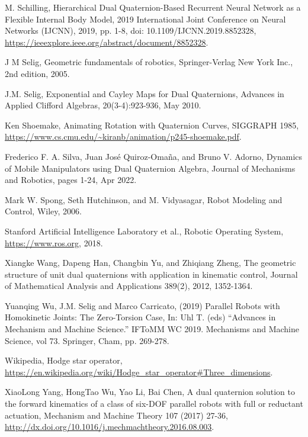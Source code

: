 \documentclass[reqno,12pt]{amsart}
\begin{document}
\begin{thebibliography}{99}
 M. Schilling, Hierarchical Dual Quaternion-Based Recurrent Neural Network as a Flexible Internal Body Model, 2019 International Joint Conference on Neural Networks (IJCNN), 2019, pp. 1-8, doi: 10.1109/IJCNN.2019.8852328, \url{https://ieeexplore.ieee.org/abstract/document/8852328}.

 J M Selig, Geometric fundamentals of robotics, Springer-Verlag New York Inc., 2nd edition, 2005.

 J.M. Selig, Exponential and Cayley Maps for Dual Quaternions, Advances in Applied Clifford Algebras, 20(3-4):923-936, May 2010.

 Ken Shoemake, Animating Rotation with Quaternion Curves, SIGGRAPH 1985, \url{https://www.cs.cmu.edu/~kiranb/animation/p245-shoemake.pdf}.

 Frederico F. A. Silva, Juan Jos\'e Quiroz-Oma\~na, and Bruno V. Adorno, Dynamics of Mobile Manipulators using Dual Quaternion Algebra, Journal of Mechanisms and Robotics, pages 1-24, Apr 2022.

 Mark W. Spong, Seth Hutchinson, and M. Vidyasagar, Robot Modeling and Control, Wiley, 2006.

 Stanford Artificial Intelligence Laboratory et al., Robotic Operating System, \url{https://www.ros.org}, 2018.

 Xiangke Wang, Dapeng Han, Changbin Yu, and Zhiqiang Zheng, The geometric structure of unit dual quaternions with application in kinematic control, Journal of Mathematical Analysis and Applications 389(2), 2012, 1352-1364.

 Yuanqing Wu, J.M. Selig and Marco Carricato,  (2019) Parallel
Robots with Homokinetic Joints: The Zero-Torsion Case, In: Uhl T. (eds) ``Advances in Mechanism and Machine Science.'' IFToMM WC 2019. Mechanisms and Machine Science, vol 73. Springer, Cham, pp. 269-278.

 Wikipedia, Hodge star operator, \url{https://en.wikipedia.org/wiki/Hodge_star_operator#Three_dimensions}.

 XiaoLong Yang, HongTao Wu, Yao Li, Bai Chen, A dual quaternion solution to the forward kinematics of a class of six-DOF parallel robots with full or reductant actuation, Mechanism and Machine Theory 107 (2017) 27-36, \url{http://dx.doi.org/10.1016/j.mechmachtheory.2016.08.003}.

\end{thebibliography}
\end{document}
